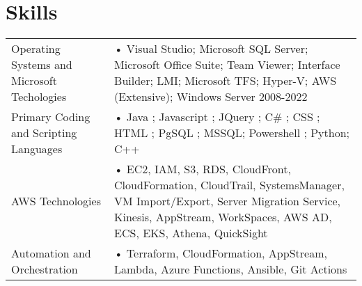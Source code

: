 \documentclass[a4paper,12pt]{article}
\begin{document}
\section{Skills}
\begin{tabularx}{\linewidth}{@{}l X@{}}
Operating Systems and Microsoft Techologies &  \normalsize{•	Visual Studio; Microsoft SQL Server; Microsoft Office Suite; Team Viewer; Interface Builder; LMI;  Microsoft TFS; Hyper-V; AWS (Extensive); Windows Server 2008-2022}\\

Primary Coding and Scripting Languages  &  \normalsize{•	Java ; Javascript ; JQuery ; C\# ; CSS ; HTML ; PgSQL ; MSSQL; Powershell ; Python; C++}\\  

AWS Technologies  &  \normalsize{•	EC2, IAM, S3, RDS, CloudFront, CloudFormation, CloudTrail, SystemsManager, VM Import/Export, Server Migration Service, Kinesis, AppStream, WorkSpaces, AWS AD, ECS, EKS, Athena, QuickSight}\\

Automation and Orchestration  &  \normalsize{•	Terraform, CloudFormation, AppStream, Lambda, Azure Functions, Ansible, Git Actions}\\

\end{tabularx}

\vfill
{}
\end{document}
